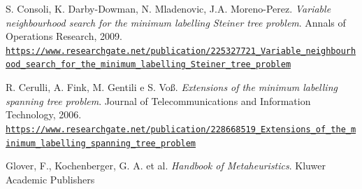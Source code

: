 \documentclass[12pt, a4paper]{article}
\begin{document}
\begin{thebibliography}{9}

S. Consoli, K. Darby-Dowman, N. Mladenovic, J.A. Moreno-Perez.
\textit{Variable neighbourhood search for the minimum labelling Steiner tree
problem}.
Annals of Operations Research, 2009.
\tiny
\\\texttt{\url{https://www.researchgate.net/publication/225327721_Variable_neighbourhood_search_for_the_minimum_labelling_Steiner_tree_problem}}
\normalsize

R. Cerulli, A. Fink, M. Gentili e S. Voß.
\textit{Extensions of the minimum labelling spanning tree problem}.
Journal of Telecommunications and Information Technology, 2006.
\tiny
\\\texttt{\url{https://www.researchgate.net/publication/228668519_Extensions_of_the_minimum_labelling_spanning_tree_problem}}
\normalsize

Glover, F., Kochenberger, G. A. et al.
\textit{Handbook of Metaheuristics}.
Kluwer Academic Publishers

\end{thebibliography}
\end{document}
